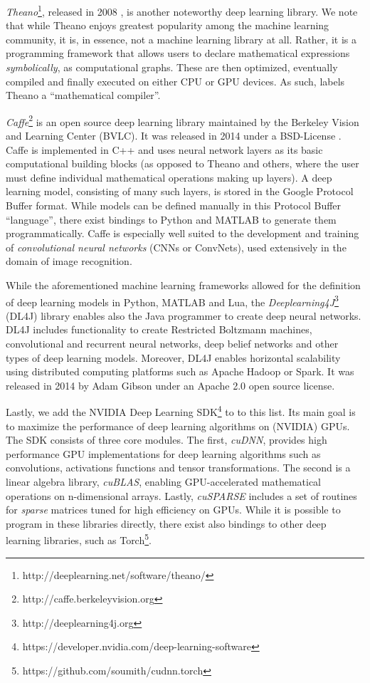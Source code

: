 \emph{Theano}\footnote{http://deeplearning.net/software/theano/}, released in
2008 \cite{theano}, is another noteworthy deep learning library. We note that
while Theano enjoys greatest popularity among the machine learning community, it
is, in essence, not a machine learning library at all. Rather, it is a
programming framework that allows users to declare mathematical expressions
\emph{symbolically}, as computational graphs. These are then optimized,
eventually compiled and finally executed on either CPU or GPU devices. As such,
\cite{theano} labels Theano a ``mathematical compiler''.

\emph{Caffe}\footnote{http://caffe.berkeleyvision.org} is an open source
deep learning library maintained by the Berkeley Vision and Learning Center
(BVLC). It was released in 2014 under a BSD-License \cite{caffe}. Caffe is
implemented in C++ and uses neural network layers as its basic computational
building blocks (as opposed to Theano and others, where the user must define
individual mathematical operations making up layers). A deep learning model,
consisting of many such layers, is stored in the Google Protocol Buffer
format. While models can be defined manually in this Protocol Buffer
``language'', there exist bindings to Python and MATLAB to generate them
programmatically. Caffe is especially well suited to the development and
training of \emph{convolutional neural networks} (CNNs or ConvNets), used
extensively in the domain of image recognition.

While the aforementioned machine learning frameworks allowed for the definition
of deep learning models in Python, MATLAB and Lua, the
\emph{Deeplearning4J}\footnote{http://deeplearning4j.org} (DL4J) library enables
also the Java programmer to create deep neural networks. DL4J includes
functionality to create Restricted Boltzmann machines, convolutional and
recurrent neural networks, deep belief networks and other types of deep learning
models. Moreover, DL4J enables horizontal scalability using distributed
computing platforms such as Apache Hadoop or Spark. It was released in 2014 by
Adam Gibson under an Apache 2.0 open source license.

Lastly, we add the NVIDIA Deep Learning
SDK\footnote{https://developer.nvidia.com/deep-learning-software} to to this
list. Its main goal is to maximize the performance of deep learning algorithms
on (NVIDIA) GPUs. The SDK consists of three core modules. The first,
\emph{cuDNN}, provides high performance GPU implementations for deep learning
algorithms such as convolutions, activations functions and tensor
transformations. The second is a linear algebra library, \emph{cuBLAS}, enabling
GPU-accelerated mathematical operations on n-dimensional arrays. Lastly,
\emph{cuSPARSE} includes a set of routines for \emph{sparse} matrices tuned for
high efficiency on GPUs. While it is possible to program in these libraries
directly, there exist also bindings to other deep learning libraries, such as
Torch\footnote{https://github.com/soumith/cudnn.torch}.

